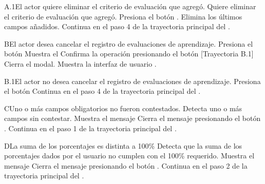 
\begin{UCtrayectoriaA}{A.1}{El actor quiere eliminar el criterio de evaluación que agregó.}
    \UCpaso[\UCactor] Quiere eliminar el criterio de evaluación que agregó.
    \UCpaso[\UCactor] Presiona el botón .
    \UCpaso Elimina los últimos campos añadidos.
    \UCpaso Continua en el paso 4 de la trayectoria principal del .
\end{UCtrayectoriaA}


\begin{UCtrayectoriaA}{B}{El actor desea cancelar el registro de evaluaciones de aprendizaje.}
    \UCpaso[\UCactor] Presiona el botón 
    \UCpaso Muestra el 
    \UCpaso[\UCactor] Confirma la operación presionando el botón  [Trayectoria B.1]
    \UCpaso Cierra el modal.
    \UCpaso Muestra la interfaz de usuario .
\end{UCtrayectoriaA}


\begin{UCtrayectoriaA}{B.1}{El actor no desea cancelar el registro de evaluaciones de aprendizaje.}
    \UCpaso[\UCactor] Presiona el botón 
    \UCpaso Continua en el paso 4 de la trayectoria principal del .
\end{UCtrayectoriaA}


\begin{UCtrayectoriaA}{C}{Uno o más campos obligatorios no fueron contestados.}
	\UCpaso Detecta uno o más campos sin contestar.
    \UCpaso Muestra el mensaje 
    \UCpaso[\UCactor] Cierra el mensaje presionando el botón .
    \UCpaso Continua en el paso 1 de la trayectoria principal del .
\end{UCtrayectoriaA}


\begin{UCtrayectoriaA}{D}{La suma de los porcentajes es distinta a 100\%}
    \UCpaso Detecta que la suma de los porcentajes dados por el usuario no cumplen con el 100\% requerido.
    \UCpaso Muestra el mensaje 
    \UCpaso[\UCactor] Cierra el mensaje presionando el botón .
    \UCpaso Continua en el paso 2 de la trayectoria principal del .
\end{UCtrayectoriaA}